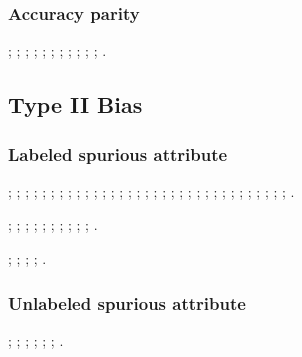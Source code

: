 \subsubsection{Accuracy parity}
\cite{multiaccuracy};
\cite{Accuracy_parity};
\cite{disparate_mistreatment_on_FPR};
\cite{conditional_learning};
\cite{accuracy_parity_gap};
\cite{FRL};
\cite{mickel2024racial};
\cite{baumann2024fairness};
\cite{akpinar2024impact};
\cite{lunich2024explainable};
\cite{dong2024addressing};
\cite{lee2024large}.




\subsection{Type II Bias}


\subsubsection{Labeled spurious attribute}
\cite{Group_DRO};
\cite{DARE};
\cite{DFR};
\cite{Study_core_features_DFR};
\cite{CVaR_DRO};
\cite{CSAD};
\cite{Back_MI};
\cite{learn_not_to_learn_Colored_MNIST};
\cite{BlindEye_IMDB_eb};
\cite{End};
\cite{BCL};
\cite{selecmix};
\cite{CLGR};
\cite{annotation_bias};
\cite{DI};
\cite{DP_difference_fpr_GAN_debiasing};
\cite{Resound};
\cite{Repair};
\cite{DisC};
\cite{DropClass};
\cite{DVQA};
\cite{ContraCAM};
\cite{rubi};
\cite{idrissi2022simple};
\cite{LearnedMixin};
\cite{Camel};
\cite{CGN};
\cite{adila2024discovering};
\cite{albuquerque2024evaluating};
\cite{jung2024simple};
\cite{zeng2024understanding};
\cite{sreelatha2024denetdm};
\cite{chakraborty2024visual};
\cite{alabdulmohsin2024clip}.





\noindent
{}
\cite{simplicity_bias_CL};
\cite{SIFER};
\cite{FRR};
\cite{feature_distortion};
\cite{Two_layer_Nets};
\cite{gatmiry2024simplicity};
\cite{tsoy2024simplicity};
\cite{rende2024distributional};
\cite{nguyen2019changing};
\cite{he2024towards};
\cite{chen2024sudden}.





\noindent
{}
\cite{Style_Randomization};
\cite{li2021shapetexture};
\cite{functional_entropy};
\cite{mishra2020dqi};
\cite{singh2020don}.




\subsubsection{Unlabeled spurious attribute}
\cite{geirhos2018imagenet};
\cite{HEX_texture_bias1}
\cite{ReBias_texture_bias2};
\cite{clark2019don};
\cite{he2019unlearn};
\cite{rubi};
\cite{clark2020learning};
\cite{utama2020mind}.






